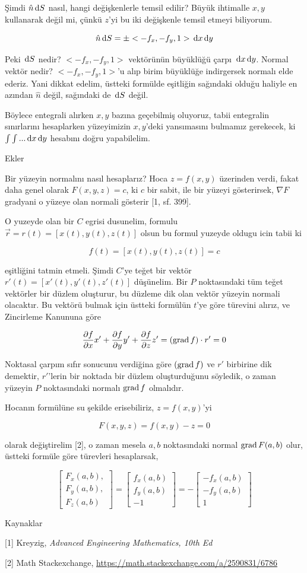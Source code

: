 \documentclass[12pt,fleqn]{article}\usepackage{../../common}
\begin{document}
Şimdi $\hat{n} \,\mathrm{d} S$ nasıl, hangi değişkenlerle temsil edilir? Büyük ihtimalle
$x,y$ kullanarak değil mi, çünkü $z$'yi bu iki değişkenle temsil etmeyi
biliyorum.

$$
\hat{n} \,\mathrm{d} S = \pm < -f_x, -f_y, 1 > \,\mathrm{d} x \,\mathrm{d} y
$$

Peki $\,\mathrm{d} S$ nedir? $< -f_x, -f_y, 1 >$ vektörünün büyüklüğü çarpı $\,\mathrm{d} x \,\mathrm{d} y$.
Normal vektör nedir? $< -f_x, -f_y, 1 >$'u alıp birim büyüklüğe indirgersek
normalı elde ederiz. Yani dikkat edelim, üstteki formülde eşitliğin sağındaki
olduğu haliyle en azından $\hat{n}$ değil, sağındaki de $\,\mathrm{d} S$ değil.

Böylece entegrali alırken $x,y$ bazına geçebilmiş oluyoruz, tabii entegralin
sınırlarını hesaplarken yüzeyimizin $x,y$'deki yansımasını bulmamız gerekecek,
ki $\int \int ... \,\mathrm{d} x \,\mathrm{d} y$ hesabını doğru yapabilelim.

Ekler

Bir yüzeyin normalını nasıl hesaplarız? Hoca $z = f(x,y)$ üzerinden verdi, fakat
daha genel olarak $F(x,y,z) = c$, ki $c$ bir sabit, ile bir yüzeyi gösterirsek,
$\nabla F$ gradyani o yüzeye olan normali gösterir [1, sf. 399].

O yuzeyde olan bir $C$ egrisi dusunelim, formulu $\vec{r} = r(t) = [x(t),y(t),z(t)]$ 
olsun bu formul yuzeyde oldugu icin tabii ki

$$
f(t) = [x(t),y(t),z(t)] = c
$$

eşitliğini tatmin etmeli. Şimdi $C$'ye teğet bir vektör $r'(t) = [x'(t),y'(t),z'(t)]$ 
düşünelim. Bir $P$ noktasındaki tüm teğet vektörler bir düzlem
oluşturur, bu düzleme dik olan vektör yüzeyin normali olacaktır. Bu vektörü
bulmak için üstteki formülün $t$'ye göre türevini alırız, ve Zincirleme Kanununa
göre

$$
\frac{\partial f}{\partial x} x' + 
\frac{\partial f}{\partial y} y' + 
\frac{\partial f}{\partial z} z'  = (\operatorname{grad} f) \cdot r' = 0
$$

Noktasal çarpım sıfır sonucunu verdiğina göre $(\operatorname{grad} f)$ ve $r'$ birbirine
dik demektir, $r'$'lerin bir noktada bir düzlem oluşturduğunu söyledik,
o zaman yüzeyin $P$ noktasındaki normalı $\operatorname{grad} f$ olmalıdır.

Hocanın formülüne su şekilde erisebiliriz, $z = f(x,y)$'yi

$$
F(x,y,z) = f(x,y) - z = 0
$$

olarak değiştirelim [2], o zaman mesela $a,b$ noktasındaki normal $\operatorname{grad} F(a,b)$
olur, üstteki formüle göre türevleri hesaplarsak,

$$
\left[\begin{array}{c}
F_x(a,b), \\ F_y(a,b), \\F_z(a,b)
\end{array}\right]
=
\left[\begin{array}{c}
f_x(a,b) \\
f_y(a,b) \\
-1
\end{array}\right]
= - \left[\begin{array}{c}
-f_x(a,b) \\
-f_y(a,b) \\
1
\end{array}\right]
$$



Kaynaklar

[1] Kreyzig, {\em Advanced Engineering Mathematics, 10th Ed}

[2] Math Stackexchange, \url{https://math.stackexchange.com/a/2590831/6786}
\end{document}

